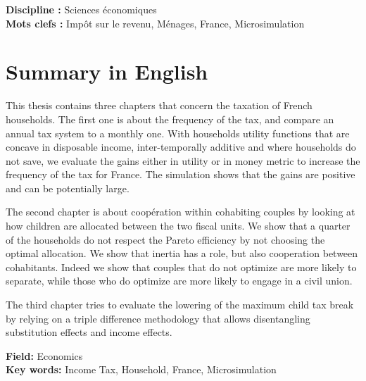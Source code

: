 \noindent \textbf{Discipline :} Sciences économiques \\
\noindent \textbf{Mots clefs :} Impôt sur le revenu, Ménages, France, Microsimulation \\

 \newpage
{} 

\chapter*{Summary in English}



This thesis contains three chapters that concern the taxation of French households. The first one is about the frequency of the tax, and compare an annual tax system to a monthly one. With households utility functions that are concave in disposable income, inter-temporally additive and where households do not save, we evaluate the gains either in utility or in money metric to increase the frequency of the tax for France. The simulation shows that the gains are positive and can be potentially large.

The second chapter is about coopération within cohabiting couples by looking at how children are allocated between the two fiscal units. We show that a quarter of the households do not respect the Pareto efficiency by not choosing the optimal allocation.
We show that inertia has a role, but also cooperation between cohabitants. Indeed we show that couples that do not optimize are more likely to separate, while those who do optimize are more likely to engage in a civil union.

The third chapter tries to evaluate the lowering of the maximum child tax break by relying on a triple difference methodology that allows disentangling substitution effects and income effects. 

\noindent \textbf{Field:} Economics \\
\noindent \textbf{Key words:} Income Tax, Household, France, Microsimulation \\



\ifx\isDoubleEmbedded\undefined
\newpage
%

\else \fi



